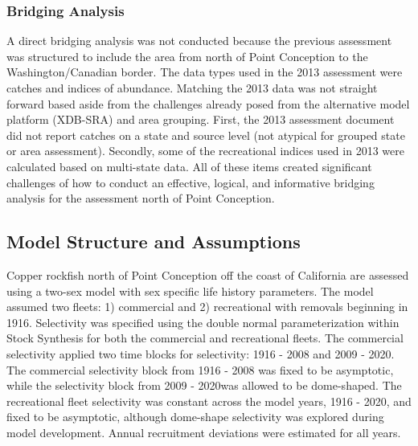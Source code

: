 \documentclass[11pt,
  english,
  a4paper,
]{article}
\begin{document}
\leavevmode\tagmcend\tagstructend\par


\hypertarget{bridging-analysis}{%
\subsubsection{Bridging Analysis}\label{bridging-analysis}}

\leavevmode\tagmcend\tagstructend


A direct bridging analysis was not conducted because the previous assessment was structured to include the area from north of Point Conception to the Washington/Canadian border. The data types used in the 2013 assessment were catches and indices of abundance. Matching the 2013 data was not straight forward based aside from the challenges already posed from the alternative model platform (XDB-SRA) and area grouping. First, the 2013 assessment document did not report catches on a state and source level (not atypical for grouped state or area assessment). Secondly, some of the recreational indices used in 2013 were calculated based on multi-state data. All of these items created significant challenges of how to conduct an effective, logical, and informative bridging analysis for the assessment north of Point Conception.

\leavevmode\tagmcend\tagstructend\par


\hypertarget{model-structure-and-assumptions}{%
\subsection{Model Structure and Assumptions}\label{model-structure-and-assumptions}}

\leavevmode\tagmcend\tagstructend


Copper rockfish north of Point Conception off the coast of California are assessed using a two-sex model with sex specific life history parameters. The model assumed two fleets: 1) commercial and 2) recreational with removals beginning in 1916. Selectivity was specified using the double normal parameterization within Stock Synthesis for both the commercial and recreational fleets. The commercial selectivity applied two time blocks for selectivity: 1916 - 2008 and 2009 - 2020. The commercial selectivity block from 1916 - 2008 was fixed to be asymptotic, while the selectivity block from 2009 - 2020was allowed to be dome-shaped. The recreational fleet selectivity was constant across the model years, 1916 - 2020, and fixed to be asymptotic, although dome-shape selectivity was explored during model development. Annual recruitment deviations were estimated for all years.
\end{document}
